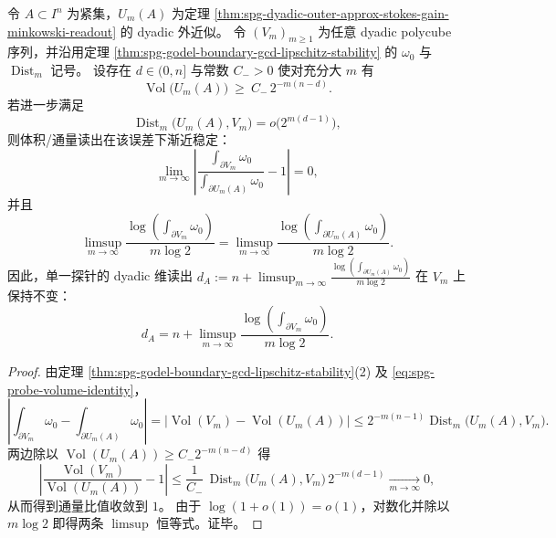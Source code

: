 \begin{corollary}\label{cor:spg-godel-stokes-distance-dimension-stability}
令 \(A\subset I^n\) 为紧集，\(U_m(A)\) 为定理 \ref{thm:spg-dyadic-outer-approx-stokes-gain-minkowski-readout} 的 dyadic 外近似。
令 \((V_m)_{m\ge 1}\) 为任意 dyadic polycube 序列，并沿用定理 \ref{thm:spg-godel-boundary-gcd-lipschitz-stability} 的 \(\omega_0\) 与 \(\operatorname{Dist}_m\) 记号。
设存在 \(d\in(0,n]\) 与常数 \(C_->0\) 使对充分大 \(m\) 有
\[
\operatorname{Vol}\bigl(U_m(A)\bigr)\ \ge\ C_-\,2^{-m(n-d)}.
\]
若进一步满足
\[
\operatorname{Dist}_m\bigl(U_m(A),V_m\bigr)=o\!\bigl(2^{m(d-1)}\bigr),
\]
则体积/通量读出在该误差下渐近稳定：
\[
\lim_{m\to\infty}\left|\frac{\int_{\partial V_m}\omega_0}{\int_{\partial U_m(A)}\omega_0}-1\right|=0,
\]
并且
\[
\limsup_{m\to\infty}\frac{\log\!\left(\int_{\partial V_m}\omega_0\right)}{m\log 2}
=
\limsup_{m\to\infty}\frac{\log\!\left(\int_{\partial U_m(A)}\omega_0\right)}{m\log 2}.
\]
因此，单一探针的 dyadic 维读出
\(
d_A:=n+\limsup_{m\to\infty}\frac{\log\!\left(\int_{\partial U_m(A)}\omega_0\right)}{m\log 2}
\)
在 \(V_m\) 上保持不变：
\[
d_A
=
n+\limsup_{m\to\infty}\frac{\log\!\left(\int_{\partial V_m}\omega_0\right)}{m\log 2}.
\]
\end{corollary}
\begin{proof}
由定理 \ref{thm:spg-godel-boundary-gcd-lipschitz-stability}(2) 及 \eqref{eq:spg-probe-volume-identity}，
\[
\left|\int_{\partial V_m}\omega_0-\int_{\partial U_m(A)}\omega_0\right|
=\bigl|\operatorname{Vol}(V_m)-\operatorname{Vol}(U_m(A))\bigr|
\le 2^{-m(n-1)}\operatorname{Dist}_m\bigl(U_m(A),V_m\bigr).
\]
两边除以 \(\operatorname{Vol}(U_m(A))\ge C_-2^{-m(n-d)}\) 得
\[
\left|\frac{\operatorname{Vol}(V_m)}{\operatorname{Vol}(U_m(A))}-1\right|
\le \frac{1}{C_-}\,\operatorname{Dist}_m\bigl(U_m(A),V_m\bigr)\,2^{-m(d-1)}
\xrightarrow[m\to\infty]{}0,
\]
从而得到通量比值收敛到 \(1\)。
由于 \(\log(1+o(1))=o(1)\)，对数化并除以 \(m\log 2\) 即得两条 \(\limsup\) 恒等式。证毕。
\end{proof}

